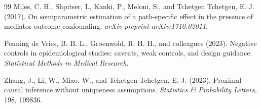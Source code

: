 \documentclass[11pt]{article}
\theoremstyle{definition}
\theoremstyle{plain}
\theoremstyle{remark}
\begin{document}
\begin{thebibliography}{99}
Miles, C. H., Shpitser, I., Kanki, P., Meloni, S., and Tchetgen Tchetgen,
E. J. (2017).
On semiparametric estimation of a path-specific effect in the presence of
mediator-outcome confounding.
\emph{arXiv preprint arXiv:1710.02011}.

Penning de Vries, B. B. L., Groenwold, R. H. H., and colleagues (2023).
Negative controls in epidemiological studies: caveats, weak controls, and design guidance.
\emph{Statistical Methods in Medical Research}.

Zhang, J., Li, W., Miao, W., and Tchetgen Tchetgen, E. J. (2023).
Proximal causal inference without uniqueness assumptions.
\emph{Statistics \& Probability Letters}, 198, 109836.
\end{thebibliography}
\end{document}
